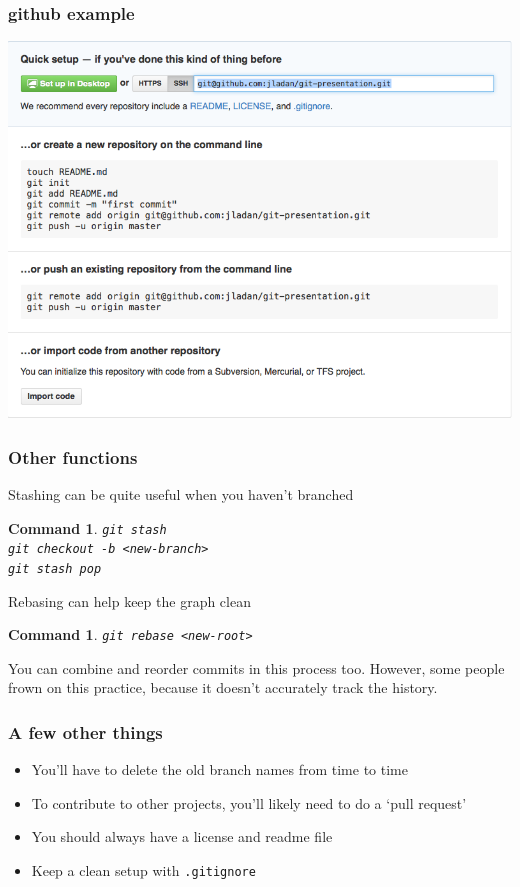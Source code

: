 \documentclass{beamer}
\newtheorem{command}[theorem]{Command}
\begin{document}
\begin{frame}
    \frametitle{github example}
    \includegraphics[height=.80\textheight]{figures/creating-on-github}
\end{frame}

\begin{frame}
    \frametitle{Other functions}
    Stashing can be quite useful when you haven't branched
    \begin{command}
        \texttt{git stash \\ git checkout -b <new-branch> \\ git stash pop}
    \end{command}

    \pause
    Rebasing can help keep the graph clean
    \begin{command}
        \texttt{git rebase <new-root>}
    \end{command}
    You can combine and reorder commits in this process too. However, some people frown on this practice, because it doesn't accurately track the history.
\end{frame}


\begin{frame}
    \frametitle{A few other things}
    \begin{itemize}
        \item You'll have to delete the old branch names from time to time
        \item To contribute to other projects, you'll likely need to do a `pull request'
        \item You should always have a license and readme file
        \item Keep a clean setup with \texttt{.gitignore}
    \end{itemize}
\end{frame}
\end{document}
